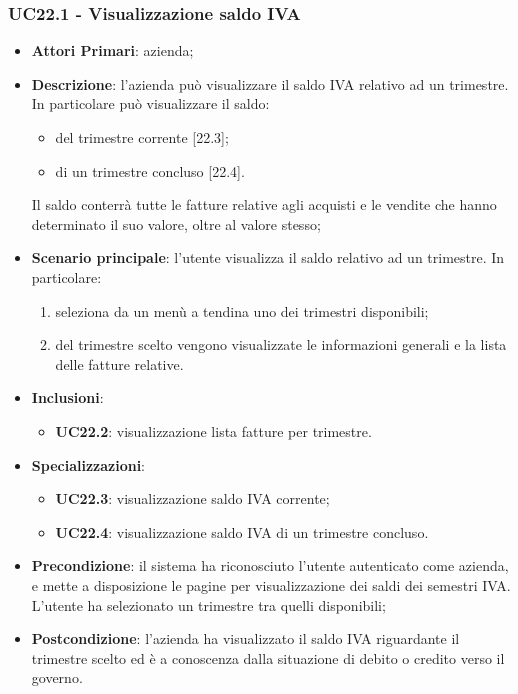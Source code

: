 \subsubsection{UC22.1 - Visualizzazione saldo IVA}
\begin{itemize}
	\item \textbf{Attori Primari}: azienda;
	\item \textbf{Descrizione}: l'azienda può visualizzare il saldo IVA relativo ad un trimestre. In particolare può visualizzare il saldo:
	\begin{itemize}
		\item del trimestre corrente [22.3];
		\item di un trimestre concluso [22.4].
	\end{itemize}
	Il saldo conterrà tutte le fatture relative agli acquisti e le vendite che hanno determinato il suo valore, oltre al valore stesso;
	\item \textbf{Scenario principale}: l'utente visualizza il saldo relativo ad un trimestre. In particolare:
	\begin{enumerate}[label=\alph*.]
		\item seleziona da un menù a tendina uno dei trimestri disponibili;
		\item del trimestre scelto vengono visualizzate le informazioni generali e la lista delle fatture relative.
	\end{enumerate}
	\item \textbf{Inclusioni}: 
	\begin{itemize}
		\item \textbf{UC22.2}: visualizzazione lista fatture per trimestre.
	\end{itemize}
	\item \textbf{Specializzazioni}: 
	\begin{itemize}
		\item \textbf{UC22.3}: visualizzazione saldo IVA corrente;
		\item \textbf{UC22.4}:  visualizzazione saldo IVA di un trimestre concluso.
	\end{itemize}
	\item \textbf{Precondizione}: il sistema ha riconosciuto l'utente autenticato come azienda, e mette a disposizione le pagine per visualizzazione dei saldi dei semestri IVA. L'utente ha selezionato un trimestre tra quelli disponibili;
	\item \textbf{Postcondizione}: l'azienda ha visualizzato il saldo IVA riguardante il trimestre scelto ed è a conoscenza dalla situazione di debito o credito verso il governo.
\end{itemize} 
